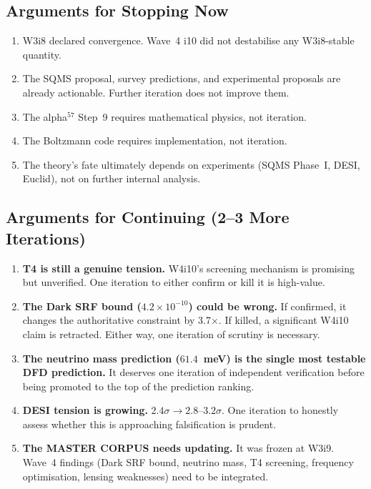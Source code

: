 \documentclass[11pt]{article}
\newcommand{\ee}[1]{\times 10^{#1}}
\begin{document}
\subsection{Arguments for Stopping Now}

\begin{enumerate}
\item W3i8 declared convergence. Wave~4 i10 did not destabilise any
  W3i8-stable quantity.
\item The SQMS proposal, survey predictions, and experimental proposals
  are already actionable. Further iteration does not improve them.
\item The alpha$^{57}$ Step~9 requires mathematical physics, not iteration.
\item The Boltzmann code requires implementation, not iteration.
\item The theory's fate ultimately depends on experiments (SQMS Phase~I,
  DESI, Euclid), not on further internal analysis.
\end{enumerate}

\subsection{Arguments for Continuing (2--3 More Iterations)}

\begin{enumerate}
\item \textbf{T4 is still a genuine tension.} W4i10's screening mechanism
  is promising but unverified. One iteration to either confirm or kill it
  is high-value.
\item \textbf{The Dark SRF bound ($4.2\ee{-10}$) could be wrong.}
  If confirmed, it changes the authoritative constraint by 3.7$\times$.
  If killed, a significant W4i10 claim is retracted. Either way, one
  iteration of scrutiny is necessary.
\item \textbf{The neutrino mass prediction ($61.4$~meV) is the single
  most testable DFD prediction.} It deserves one iteration of
  independent verification before being promoted to the top of the
  prediction ranking.
\item \textbf{DESI tension is growing.} $2.4\sigma \to 2.8$--$3.2\sigma$.
  One iteration to honestly assess whether this is approaching
  falsification is prudent.
\item \textbf{The MASTER CORPUS needs updating.} It was frozen at W3i9.
  Wave~4 findings (Dark SRF bound, neutrino mass, T4 screening, frequency
  optimisation, lensing weaknesses) need to be integrated.
\end{enumerate}
\end{document}

